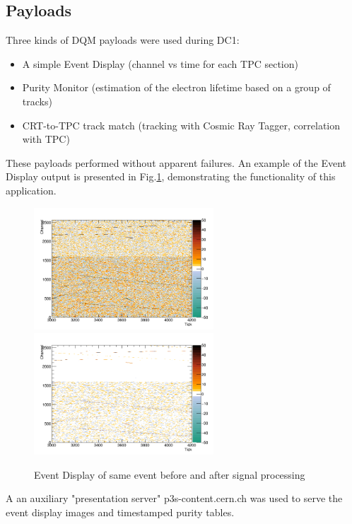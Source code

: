 \documentclass[pdftex,12pt,letter]{article}
\begin{document}
\subsection{Payloads}
Three kinds of DQM payloads were used during DC1:
\begin{itemize}
\item A simple Event Display (channel vs time for each TPC section)
\item Purity Monitor (estimation of the electron lifetime based on a group of tracks)
\item CRT-to-TPC track match (tracking with Cosmic Ray Tagger, correlation with TPC)
\end{itemize}
\noindent These payloads performed without apparent failures. An example of the Event Display output
is presented in Fig.\ref{fig:evdisp}, demonstrating the functionality of this application.
\begin{figure}[tbh]
  \centering
  \includegraphics[width=0.6\textwidth]{./ReportImages/adcraw_evt33_ch0-2559.png}
  \includegraphics[width=0.6\textwidth]{./ReportImages/adcprep_evt33_ch0-2559.png}

  \caption{Event Display of same event before and after signal processing}
  \label{fig:evdisp}
\end{figure}

\noindent  A an auxiliary "presentation server" p3s-content.cern.ch
was used to serve the event display images and timestamped purity tables.
\end{document}
